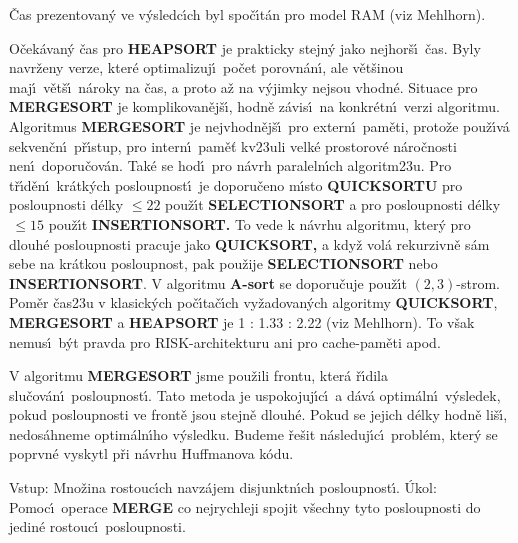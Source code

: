 \flushpar\v Cas prezentovan\'y ve v\'ysledc\'\i ch byl spo\v c\'\i t\'an 
pro model RAM (viz Mehlhorn).
\medskip

\flushpar O\v cek\'avan\'y \v cas pro {\bf HEAPSORT} je prakticky stejn\'y jako 
nej\-hor\v s\'\i\ \v cas.  Byly navr\v zeny verze, kter\'e optimalizuj\'\i\ 
po\v cet porov\-n\'an\'\i , ale v\v et\v sinou maj\'\i\ v\v et\v s\'\i\ n\'aroky na 
\v cas, a proto a\v z na v\'yjimky ne\-jsou vhodn\'e.  
Situace pro {\bf MERGESORT} je komplikovan\v ej\v s\'\i , hod\-n\v e z\'avis\'\i\ 
na konkr\'etn\'\i\ verzi algoritmu.  Algoritmus 
{\bf MER\-GE\-SORT} je nejvhodn\v ej\v s\'\i\ pro extern\'\i\ pam\v eti, proto\v ze 
pou\v z\'\i v\'a sekven\v cn\'\i\ p\v r\'\i stup, pro intern\'\i\ pam\v e\v t 
kv\accent23uli velk\'e prostorov\'e n\'aro\v cnosti 
nen\'\i\ doporu\v cov\'an.  Tak\'e se hod\'\i\ pro 
n\'avrh pa\-ra\-leln\'\i ch algoritm\accent23u. Pro t\v r\'\i d\v en\'\i\ 
kr\'atk\'ych posloupnost\'\i\ je doporu\v ceno m\'\i sto {\bf QUICKSORTU }
pro posloupnosti d\'elky $\le 22$ pou\v z\'\i t {\bf SELECTIONSORT} a pro 
posloupnosti d\'elky $\,\le 15$ pou\v z\'\i t {\bf INSERTIONSORT.}
To vede k n\'avrhu algoritmu, kter\'y 
pro dlouh\'e posloupnosti pracuje jako {\bf QUICKSORT,} a kdy\v z 
vol\'a rekurzivn\v e s\'am sebe na kr\'atkou posloupnost, pak 
pou\v zije {\bf SELECTIONSORT} ne\-bo {\bf INSERTIONSORT}. V algoritmu {\bf A-sort }
se doporu\-\v cu\-je pou\v z\'\i t $(2,3)$-strom.  
Pom\v er \v cas\accent23u v klasick\'ych po\v c\'\i ta\v c\'\i ch vy\v zadovan\'ych algoritmy {\bf QUICKSORT}, 
{\bf MERGESORT} a {\bf HEAPSORT} je 1 : 1.33 : 2.22 (viz Mehlhorn). To v\v sak nemus\'\i\ 
b\'yt pravda pro RISK-architekturu ani pro cache-pam\v eti 
apod. 
\medskip

\flushpar V algoritmu {\bf MERGESORT} jsme pou\v zili frontu, 
kter\'a \v r\'\i dila slu\v cov\'an\'\i\ posloupnost\'\i . Tato metoda je 
uspokojuj\'\i c\'\i\ a d\'av\'a optim\'aln\'\i\ v\'ysledek, pokud 
posloupnosti ve front\v e jsou stejn\v e dlouh\'e. Pokud se 
jejich d\'elky hodn\v e li\v s\'\i , nedos\'ahneme 
optim\'aln\'\i ho v\'ysledku. Budeme \v re\v sit n\'asleduj\'\i c\'\i\ 
probl\'em, kter\'y se poprvn\'e vyskytl p\v ri n\'avrhu Huffmanova k\'odu. 
\bigskip

\flushpar Vstup: Mno\v zina rostouc\'\i ch navz\'ajem 
disjunktn\'\i ch posloupnost\'\i .\newline 
\'Ukol:  Pomoc\'\i\ operace {\bf MERGE} co nejrychleji spojit 
v\v sechny tyto posloupnosti do jedin\'e rostouc\'\i\ posloupnosti.  
\medskip

